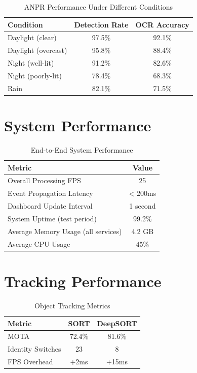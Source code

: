 \documentclass[12pt,a4paper]{report}
\begin{document}
\begin{table}[H]
\centering
\caption{ANPR Performance Under Different Conditions}
\begin{tabular}{|l|c|c|}
\hline
\textbf{Condition} & \textbf{Detection Rate} & \textbf{OCR Accuracy} \\
\hline
Daylight (clear) & 97.5\% & 92.1\% \\
\hline
Daylight (overcast) & 95.8\% & 88.4\% \\
\hline
Night (well-lit) & 91.2\% & 82.6\% \\
\hline
Night (poorly-lit) & 78.4\% & 68.3\% \\
\hline
Rain & 82.1\% & 71.5\% \\
\hline
\end{tabular}
\end{table}

\section{System Performance}

\begin{table}[H]
\centering
\caption{End-to-End System Performance}
\begin{tabular}{|l|c|}
\hline
\textbf{Metric} & \textbf{Value} \\
\hline
Overall Processing FPS & 25 \\
\hline
Event Propagation Latency & < 200ms \\
\hline
Dashboard Update Interval & 1 second \\
\hline
System Uptime (test period) & 99.2\% \\
\hline
Average Memory Usage (all services) & 4.2 GB \\
\hline
Average CPU Usage & 45\% \\
\hline
\end{tabular}
\end{table}

\section{Tracking Performance}

\begin{table}[H]
\centering
\caption{Object Tracking Metrics}
\begin{tabular}{|l|c|c|}
\hline
\textbf{Metric} & \textbf{SORT} & \textbf{DeepSORT} \\
\hline
MOTA & 72.4\% & 81.6\% \\
\hline
Identity Switches & 23 & 8 \\
\hline
FPS Overhead & +2ms & +15ms \\
\hline
\end{tabular}
\end{table}
\end{document}
